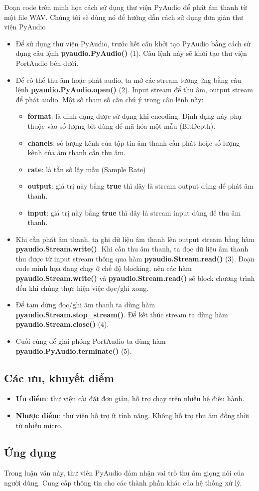 Đoạn code trên minh họa cách sử dụng thư viện PyAudio để phát âm thanh từ một file WAV. Chúng tôi sẽ dùng nó để hướng dẫn cách sử dụng đơn giản thư viện PyAudio
\begin{itemize}
	\item Để sử dụng thư viện PyAudio, trước hết cần khởi tạo PyAudio bằng cách sử dụng câu lệnh \textbf{pyaudio.PyAudio()} (1). Câu  lệnh này sẽ khởi tạo thư viện PortAudio bên dưới.
	\item Để có thể thu âm hoặc phát audio, ta mở các stream tương ứng bằng câu lệnh \textbf{pyaudio.PyAudio.open()} (2). Input stream để thu âm, output stream để phát audio. Một số tham số cần chú ý trong câu lệnh này:
	\begin{itemize}
		\item \textbf{format}: là định dạng được sử dụng khi encoding. Định dạng này phụ thuộc vào số lượng bit dùng để mã hóa một mẫu (BitDepth).
		\item \textbf{chanels}: số lượng kênh của tập tin âm thanh cần phát hoặc số lượng kênh của âm thanh cần thu âm.
		\item \textbf{rate}: là tần số lấy mẫu (Sample Rate)
		\item \textbf{output}: giá trị này bằng \textbf{true} thì đây là stream output dùng để phát âm thanh.
		\item \textbf{input}: giá trị này bằng \textbf{true} thì đây là stream input dùng để thu âm thanh.
	\end{itemize}
	\item Khi cần phát âm thanh, ta ghi dữ liệu âm thanh lên output stream bằng hàm \textbf{pyaudio.Stream.write()}. Khi cần thu âm thanh, ta đọc dữ liệu âm thanh thu được từ input stream thông qua hàm \textbf{pyaudio.Stream.read()} (3). Đoạn code minh họa đang chạy ở chế độ blocking, nên các hàm \textbf{pyaudio.Stream.write()} và \textbf{pyaudio.Stream.read()} sẽ block chương trình đến khi chúng thực hiện việc đọc/ghi xong.
	\item Để tạm dừng đọc/ghi âm thanh ta dùng hàm \textbf{pyaudio.Stream.stop\_stream()}. Để kết thúc stream ta dùng hàm \textbf{pyaudio.Stream.close()} (4).
	\item Cuối cùng để giải phóng PortAudio ta dùng hàm \textbf{pyaudio.PyAudio.terminate()} (5).
\end{itemize}

\subsection{Các ưu, khuyết điểm}
\begin{itemize}
	\item \textbf{Ưu điểm}: thư viện cài đặt đơn giản, hỗ trợ chạy trên nhiều hệ điều hành.
	\item \textbf{Nhược điểm}: thư viện hỗ trợ ít tính năng. Không hỗ trợ thu âm đồng thời từ nhiều micro.
\end{itemize}

\subsection{Ứng dụng}
Trong luận văn này, thư viên PyAudio đảm nhận vai trò thu âm giọng nói của người dùng. Cung cấp thông tin cho các thành phần khác của hệ thống xử lý.





